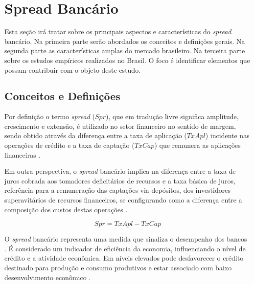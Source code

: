 \documentclass[
  12pt,
  12pt,
  openright,
  oneside,
  a4paper,
  chapter=TITLE,
  section=TITLE,
  subsection=TITLE,
  subsubsection=TITLE,
  english,
  portugues,
  sumario=tradicional]{abntex2}
\begin{document}
\textual
\pagestyle{simple}
\parindent 1.50cm

\section{Spread Bancário}\label{sec:spread}

Esta seção irá tratar sobre os principais aspectos e características do \emph{spread} bancário. Na primeira parte serão abordados os conceitos e definições gerais. Na segunda parte as características amplas do mercado brasileiro. Na terceira parte sobre os estudos empíricos realizados no Brasil. O foco é identificar elementos que possam contribuir com o objeto deste estudo.

\subsection{Conceitos e Definições}

Por definição o termo \emph{spread} (\(Spr\)), que em tradução livre significa amplitude, crescimento e extensão, é utilizado no setor financeiro no sentido de margem, sendo obtido através da diferença entre a taxa de aplicação (\(TxApl\)) incidente nas operações de crédito e a taxa de captação (\(TxCap\)) que remunera as aplicações financeiras \cite{BCB:2000, BCB:1999}.

Em outra perspectiva, o \emph{spread} bancário implica na diferença entre a taxa de juros cobrada aos tomadores deficitários de recursos e a taxa básica de juros, referência para a remuneração das captações via depósitos, dos investidores superavitários de recursos financeiros, se configurando como a diferença entre a composição dos custos destas operações \cite{BCB:1999}.

\begin{equation}
Spr = TxApl - TxCap
\end{equation}

O \emph{spread} bancário representa uma medida que sinaliza o desempenho dos bancos \cite{levine:1997}. É considerado um indicador de eficiência da economia, influenciando o nível de crédito e a atividade econômica. Em níveis elevados pode desfavorecer o crédito destinado para produção e consumo produtivos e estar associado com baixo desenvolvimento econômico \cite{WB:2005}.
\end{document}
